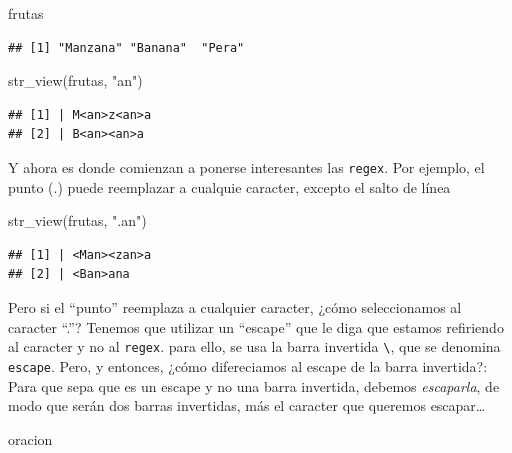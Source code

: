 \documentclass[
]{book}
\newenvironment{Shaded}{\begin{snugshade}}{\end{snugshade}}
\newcommand{\FunctionTok}[1]{\textcolor[rgb]{0.00,0.00,0.00}{#1}}
\newcommand{\NormalTok}[1]{#1}
\newcommand{\StringTok}[1]{\textcolor[rgb]{0.31,0.60,0.02}{#1}}
\begin{document}
\begin{Shaded}
\begin{Highlighting}[]
\NormalTok{frutas}
\end{Highlighting}
\end{Shaded}

\begin{verbatim}
## [1] "Manzana" "Banana"  "Pera"
\end{verbatim}

\begin{Shaded}
\begin{Highlighting}[]
\FunctionTok{str\_view}\NormalTok{(frutas, }\StringTok{"an"}\NormalTok{)}
\end{Highlighting}
\end{Shaded}

\begin{verbatim}
## [1] | M<an>z<an>a
## [2] | B<an><an>a
\end{verbatim}

Y ahora es donde comienzan a ponerse interesantes las \texttt{regex}. Por ejemplo, el punto (.) puede reemplazar a cualquie caracter, excepto el salto de línea

\begin{Shaded}
\begin{Highlighting}[]
\FunctionTok{str\_view}\NormalTok{(frutas, }\StringTok{".an"}\NormalTok{)}
\end{Highlighting}
\end{Shaded}

\begin{verbatim}
## [1] | <Man><zan>a
## [2] | <Ban>ana
\end{verbatim}

Pero si el ``punto'' reemplaza a cualquier caracter, ¿cómo seleccionamos al caracter ``.''? Tenemos que utilizar un ``escape'' que le diga que estamos refiriendo al caracter y no al \texttt{regex}. para ello, se usa la barra invertida \texttt{\textbackslash{}}, que se denomina \texttt{escape}. Pero, y entonces, ¿cómo difereciamos al escape de la barra invertida?: Para que sepa que es un escape y no una barra invertida, debemos \emph{escaparla}, de modo que serán dos barras invertidas, más el caracter que queremos escapar\ldots{}

\begin{Shaded}
\begin{Highlighting}[]
\NormalTok{oracion}
\end{Highlighting}
\end{Shaded}
\end{document}

